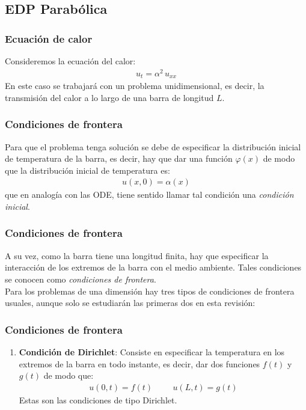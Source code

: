 \documentclass[12pt]{beamer}
\begin{document}
\subsection{EDP Parabólica}

\begin{frame}
\frametitle{Ecuación de calor}
Consideremos la ecuación del calor:
\begin{align*}
u_{t} =  \alpha^{2} \,  u_{xx}
\end{align*}
En este caso se trabajará con un problema unidimensional, es decir, la transmisión del calor a lo largo de una barra de longitud $L$.
\end{frame}
\begin{frame}
\frametitle{Condiciones de frontera}
Para que el problema tenga solución se debe de especificar la distribución inicial de temperatura de la barra, es decir, hay que dar una función $\varphi (x)$ de modo que la distribución inicial de temperatura es:
\begin{align}
u(x, 0) = \alpha (x)
\label{eq:ecuacion_06_02_02}
\end{align}
que en analogía con las ODE, tiene sentido llamar tal condición una \emph{condición inicial}.
\end{frame}
\begin{frame}
\frametitle{Condiciones de frontera}
A su vez, como la barra tiene una longitud finita, hay que especificar la interacción de los extremos de la barra con el medio ambiente. Tales condiciones se conocen como \emph{condiciones de frontera}.
\\
\bigskip
\pause
Para los problemas de una dimensión hay tres tipos de condiciones de frontera usuales, aunque solo se estudiarán las primeras dos en esta revisión:
\end{frame}
\begin{frame}
\frametitle{Condiciones de frontera}
\begin{enumerate}
\item \textbf{Condición de Dirichlet}: Consiste en especificar la temperatura en los extremos de la barra en todo instante, es decir, dar dos funciones $f(t)$ y $g(t)$ de modo que:
\begin{align}
u(0, t) = f (t)  \hspace{1cm} u(L, t) = g(t)
\label{eq:ecuacion_06_02_03}    
\end{align}
Estas son las condiciones de tipo Dirichlet.
\seti
\end{enumerate}
\end{frame}
\end{document}
